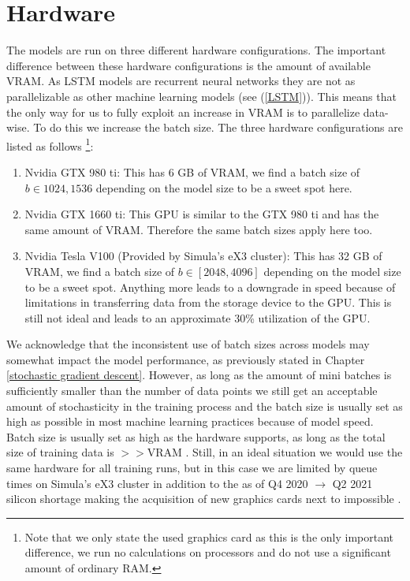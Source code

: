 \section{Hardware}
The models are run on three different hardware configurations. The important difference 
between these hardware configurations is the amount of available VRAM. As LSTM models 
are recurrent neural networks they are not as parallelizable as other machine learning 
models (see (\ref{LSTM})). This means that the only way for us to fully exploit 
an increase in VRAM is to parallelize data-wise. To do this we increase the batch size.
The three hardware configurations are listed as follows \footnote{Note that we only 
state the used graphics card as this is the only important difference, we run no 
calculations on processors and do not use a significant amount of ordinary RAM.}:
\begin{enumerate}
    \item Nvidia GTX 980 ti: This has 6 GB of VRAM, we find a batch size of $b\in{1024, 1536}$ 
     depending on the model size to be a sweet spot here.
    \item Nvidia GTX 1660 ti: This GPU is similar to the GTX 980 ti and has the 
        same amount of VRAM. Therefore the same batch sizes apply here too.
    \item Nvidia Tesla V100 (Provided by Simula's eX3 cluster): This has 32 GB of VRAM, 
        we find a batch size of $b\in[2048,4096]$ depending on the model size
        to be a sweet spot. Anything more leads to a downgrade in speed because 
        of limitations in transferring data from the storage device to the GPU. 
        This is still not ideal and leads to an approximate 30\% utilization of the 
        GPU.
\end{enumerate}
We acknowledge that the inconsistent use of batch sizes across models may somewhat 
impact the model performance, as previously stated in Chapter \ref{stochastic gradient descent}.
However, as long as the amount of mini batches is sufficiently smaller than the number of data points we 
still get an acceptable amount of stochasticity in the training process and the batch 
size is usually set as high as possible in most machine learning practices because 
of model speed. Batch size is usually set as high as the hardware supports, as long 
as the total size of training data is $>>$VRAM \citationneeded.
Still, in an ideal situation we would use the same hardware for all training runs, 
but in this case we are limited by queue times on Simula's eX3 cluster in addition 
to the as of Q4 2020 $\rightarrow$ Q2 2021 silicon shortage making the acquisition of 
new graphics cards next to impossible \citep{GPUShortage}.
